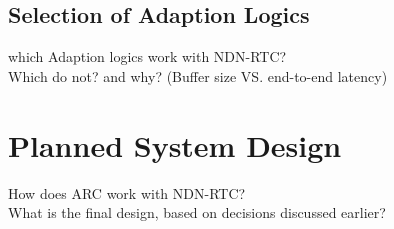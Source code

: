 \subsection{Selection of Adaption Logics}
which Adaption logics work with NDN-RTC? \\
Which do not? and why? (Buffer size VS. end-to-end latency)

\section{Planned System Design}
How does ARC work with NDN-RTC? \\
What is the final design, based on decisions discussed earlier?
